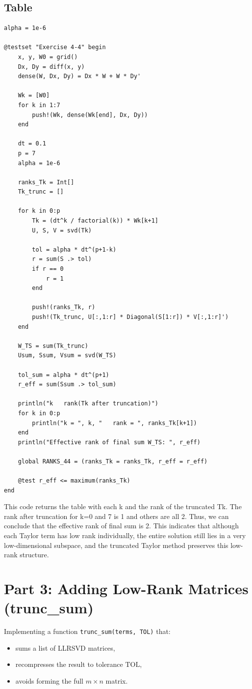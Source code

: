 \documentclass[11pt]{report}
\begin{document}
\subsection{Table}
\begin{lstlisting}
alpha = 1e-6

@testset "Exercise 4-4" begin
    x, y, W0 = grid()
    Dx, Dy = diff(x, y)
    dense(W, Dx, Dy) = Dx * W + W * Dy'

    Wk = [W0]
    for k in 1:7
        push!(Wk, dense(Wk[end], Dx, Dy))
    end

    dt = 0.1
    p = 7
    alpha = 1e-6

    ranks_Tk = Int[]
    Tk_trunc = []

    for k in 0:p
        Tk = (dt^k / factorial(k)) * Wk[k+1]
        U, S, V = svd(Tk)

        tol = alpha * dt^(p+1-k)
        r = sum(S .> tol)
        if r == 0
            r = 1
        end

        push!(ranks_Tk, r)
        push!(Tk_trunc, U[:,1:r] * Diagonal(S[1:r]) * V[:,1:r]')
    end

    W_TS = sum(Tk_trunc)
    Usum, Ssum, Vsum = svd(W_TS)

    tol_sum = alpha * dt^(p+1)
    r_eff = sum(Ssum .> tol_sum)

    println("k   rank(Tk after truncation)")
    for k in 0:p
        println("k = ", k, "   rank = ", ranks_Tk[k+1])
    end
    println("Effective rank of final sum W_TS: ", r_eff)

    global RANKS_44 = (ranks_Tk = ranks_Tk, r_eff = r_eff)

    @test r_eff <= maximum(ranks_Tk)
end

\end{lstlisting}

This code returns the table with each k and the rank of the truncated Tk. The rank after truncation for k=0 and 7 is 1 and others are all 2. Thus, we can conclude that the effective rank of final sum is 2. This indicates that although each Taylor term has low rank individually, the entire solution still lies in a very low-dimensional subspace, and the truncated Taylor method preserves this low-rank structure.


\section{Part 3: Adding Low-Rank Matrices (trunc\_sum)}

Implementing a function \texttt{trunc\_sum(terms, TOL)} that:
\begin{itemize}[leftmargin=*]
    \item sums a list of LLRSVD matrices,
    \item recompresses the result to tolerance \(\mathrm{TOL}\),
    \item avoids forming the full \(m \times n\) matrix.
\end{itemize}
\end{document}
